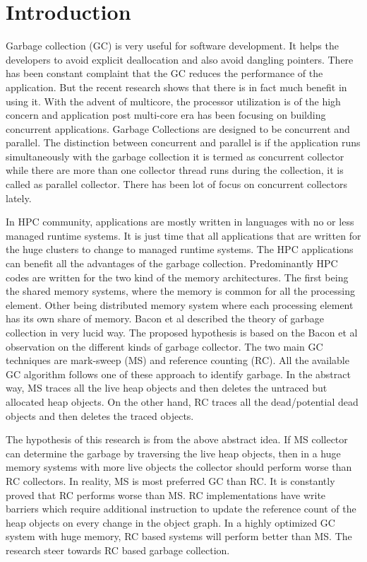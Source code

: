 \section{Introduction}
Garbage collection (GC) is very useful for software development. It helps the developers to avoid explicit deallocation and also avoid dangling pointers. There has been constant complaint that the GC reduces the performance of the application. But the recent research shows that there is in fact much benefit in using it. With the advent of multicore, the processor utilization is of the high concern and application post multi-core era has been focusing on building concurrent applications. Garbage Collections are designed to be concurrent and parallel. The distinction between concurrent and parallel is if the application runs simultaneously with the garbage collection it is termed as concurrent collector while there are more than one collector thread runs during the collection, it is called as parallel collector. There has been lot of focus on concurrent collectors lately. 

In HPC community, applications are mostly written in languages with no or less managed runtime systems. It is just time that all applications that are written for the huge clusters to change to managed runtime systems. The HPC applications can benefit all the advantages of the garbage collection. Predominantly HPC codes are written for the two kind of the memory architectures. The first being the shared memory systems, where the memory is common for all the processing element. Other being distributed memory system where each processing element has its own share of memory. Bacon et al described the theory of garbage collection in very lucid way. The proposed hypothesis is based on the Bacon et al observation on the different kinds of garbage collector. The two main GC techniques are mark-sweep (MS) and reference counting (RC). All the available GC algorithm follows one of these approach to identify garbage. In the abstract way, MS traces all the live heap objects and then deletes the untraced but allocated heap objects. On the other hand, RC traces all the dead/potential dead objects and then deletes the traced objects. 

The hypothesis of this research is from the above abstract idea. If MS collector can determine the garbage by traversing the live heap objects, then in a huge memory systems with more live objects the collector should perform worse than RC collectors. In reality, MS is most preferred GC than RC. It is constantly proved that RC performs worse than MS. RC implementations have write barriers which require additional instruction to update the reference count of the heap objects on every change in the object graph.
In a highly optimized GC system with huge memory, RC based systems will perform better than MS. The research steer towards RC based garbage collection.
